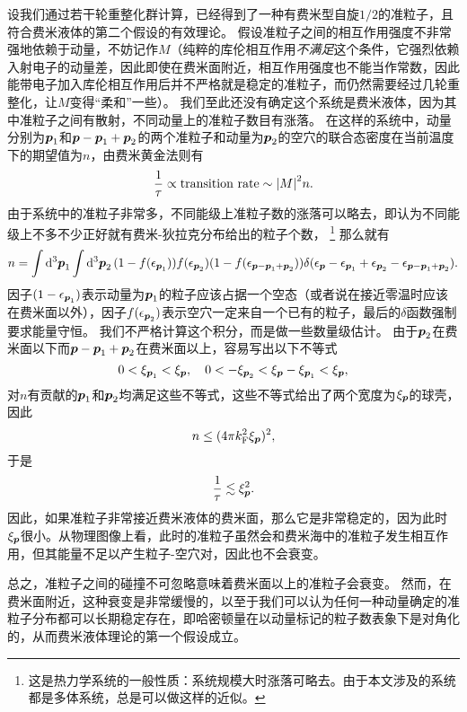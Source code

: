 设我们通过若干轮重整化群计算，已经得到了一种有费米型自旋$1/2$的准粒子，且符合费米液体的第二个假设的有效理论。
假设准粒子之间的相互作用强度不非常强地依赖于动量，不妨记作$M$（纯粹的库伦相互作用\emph{不满足}这个条件，它强烈依赖入射电子的动量差，因此即使在费米面附近，相互作用强度也不能当作常数，因此能带电子加入库伦相互作用后并不严格就是稳定的准粒子，而仍然需要经过几轮重整化，让$M$变得“柔和”一些）。
我们至此还没有确定这个系统是费米液体，因为其中准粒子之间有散射，不同动量上的准粒子数目有涨落。
在这样的系统中，动量分别为$\vb*{p}_1$和$\vb*{p} - \vb*{p}_1 + \vb*{p}_2$的两个准粒子和动量为$\vb*{p}_2$的空穴的联合态密度在当前温度下的期望值为$n$，由费米黄金法则有
\[
    \frac{1}{\tau} \propto \text{transition rate} \sim \abs{M}^2 n.
\]
由于系统中的准粒子非常多，不同能级上准粒子数的涨落可以略去，即认为不同能级上不多不少正好就有费米-狄拉克分布给出的粒子个数，%
\footnote{这是热力学系统的一般性质：系统规模大时涨落可略去。由于本文涉及的系统都是多体系统，总是可以做这样的近似。}%
那么就有
\[
    n = \int \dd[3]{\vb*{p}_1} \int \dd[3]{\vb*{p}_2} (1 - f(\epsilon_{\vb*{p}_1})) f(\epsilon_{\vb*{p}_2}) (1 - f(\epsilon_{\vb*{p} - \vb*{p}_1 + \vb*{p}_2})) \delta(\epsilon_{\vb*{p}} - \epsilon_{\vb*{p}_1} + \epsilon_{\vb*{p}_2} - \epsilon_{\vb*{p} - \vb*{p}_1 + \vb*{p}_2}).
\]
因子$(1-\epsilon_{\vb*{p}_1})$表示动量为$\vb*{p}_1$的粒子应该占据一个空态（或者说在接近零温时应该在费米面以外），因子$f(\epsilon_{\vb*{p}_2})$表示空穴一定来自一个已有的粒子，最后的$\delta$函数强制要求能量守恒。
我们不严格计算这个积分，而是做一些数量级估计。
由于$\vb*{p}_2$在费米面以下而$\vb*{p}- \vb*{p}_1 + \vb*{p}_2$在费米面以上，容易写出以下不等式
\[
    0 < \xi_{\vb*{p}_1} < \xi_{\vb*{p}}, \quad 0 < - \xi_{\vb*{p}_2} < \xi_{\vb*{p}} - \xi_{\vb*{p}_1} < \xi_{\vb*{p}},
\]
对$n$有贡献的$\vb*{p}_1$和$\vb*{p}_2$均满足这些不等式，这些不等式给出了两个宽度为$\xi_{\vb*{p}}$的球壳，因此
\[
    n \leq (4 \pi k_\text{F}^2 \xi_{\vb*{p}})^2,
\]
于是
\begin{equation}
    \frac{1}{\tau} \lesssim \xi_{\vb*{p}}^2.
    \label{eq:fermi-liquid-lifetime}
\end{equation}
因此，如果准粒子非常接近费米液体的费米面，那么它是非常稳定的，因为此时$\xi_{\vb*{p}}$很小。从物理图像上看，此时的准粒子虽然会和费米海中的准粒子发生相互作用，但其能量不足以产生粒子-空穴对，因此也不会衰变。

总之，准粒子之间的碰撞不可忽略意味着费米面以上的准粒子会衰变。
然而，在费米面附近，这种衰变是非常缓慢的，以至于我们可以认为任何一种动量确定的准粒子分布都可以长期稳定存在，即哈密顿量在以动量标记的粒子数表象下是对角化的，从而费米液体理论的第一个假设成立。

